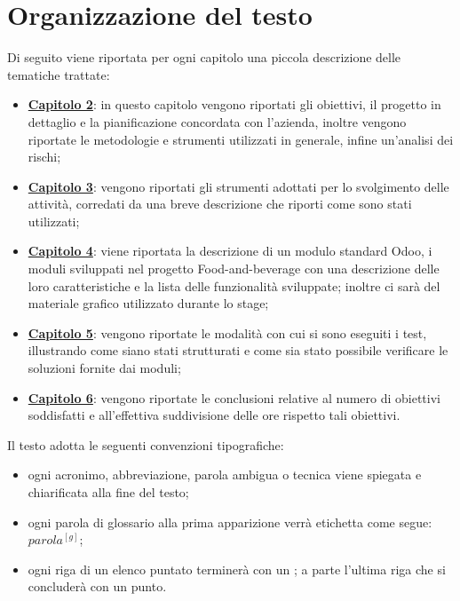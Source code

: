 \section{Organizzazione del testo}
Di seguito viene riportata per ogni capitolo una piccola descrizione delle tematiche trattate:
\begin{itemize}
	\item \hyperlink{(chap:capitolo2)}{\textbf{Capitolo 2}}: in questo capitolo vengono riportati gli obiettivi, il progetto in dettaglio e la pianificazione concordata con l'azienda, inoltre vengono riportate le metodologie e strumenti utilizzati in generale, infine un'analisi dei rischi;
	\item \hyperlink{(chap:capitolo6)}{\textbf{Capitolo 3}}: vengono riportati gli strumenti adottati per lo svolgimento delle attività, corredati da una breve descrizione che riporti come sono stati utilizzati;
	\item \hyperlink{(chap:capitolo4)}{\textbf{Capitolo 4}}: viene riportata la descrizione di un modulo standard Odoo, i moduli sviluppati nel progetto Food-and-beverage con una descrizione delle loro caratteristiche e la lista delle funzionalità sviluppate; inoltre ci sarà del materiale grafico utilizzato durante lo stage;
	\item \hyperlink{(chap:capitolo5)}{\textbf{Capitolo 5}}: vengono riportate le modalità con cui si sono eseguiti i test, illustrando come siano stati strutturati e come sia stato possibile verificare le soluzioni fornite dai moduli;
	\item \hyperlink{(chap:capitolo8)}{\textbf{Capitolo 6}}: vengono riportate le conclusioni relative al numero di obiettivi soddisfatti e all'effettiva suddivisione delle ore rispetto tali obiettivi.

\end{itemize}
\vspace*{1cm}
Il testo adotta le seguenti convenzioni tipografiche:
\begin{itemize}
	\item ogni acronimo, abbreviazione, parola ambigua o tecnica viene spiegata e chiarificata alla fine del testo;
	\item ogni parola di glossario alla prima apparizione verrà etichetta come segue: $parola^{[g]}$;
	\item ogni riga di un elenco puntato terminerà con un ; a parte l'ultima riga che si concluderà con un punto.
\end{itemize}